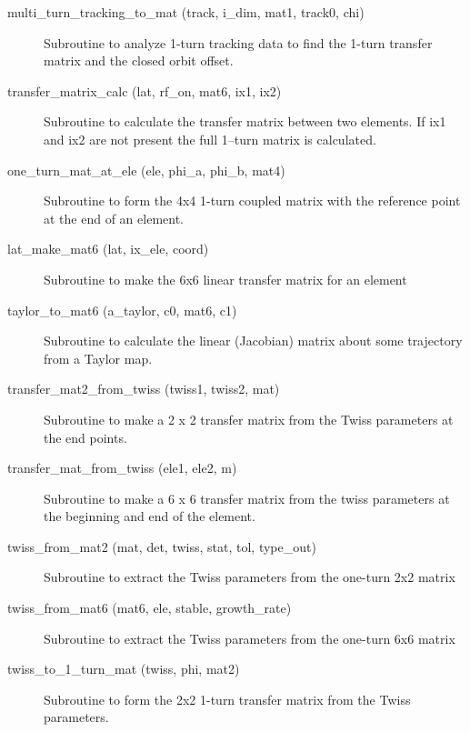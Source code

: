 \begin{description}
\label{r:multi.turn.tracking.to.mat}
\item[multi_turn_tracking_to_mat (track, i_dim, mat1, track0, chi)] \Newline
Subroutine to analyze 1-turn tracking data to find the 1-turn transfer matrix 
and the closed orbit offset.

\label{r:transfer.matrix.calc}
\item[transfer_matrix_calc (lat, rf_on, mat6, ix1, ix2)] \Newline
Subroutine to calculate the transfer matrix between two elements. If
ix1 and ix2 are not present the full 1--turn matrix is calculated.

\label{r:one.turn.mat.at.ele}
\item[one_turn_mat_at_ele (ele, phi_a, phi_b, mat4)] \Newline
Subroutine to form the 4x4 1-turn coupled matrix with the reference point 
at the end of an element. 

\label{r:lat.make.mat6}
\item[lat_make_mat6 (lat, ix_ele, coord)] \Newline
Subroutine to make the 6x6 linear transfer matrix for an element 

\label{r:taylor.to.mat6}
\item[taylor_to_mat6 (a_taylor, c0, mat6, c1)] \Newline
Subroutine to calculate the linear (Jacobian) matrix about some trajectory from a Taylor map. 

\label{r:transfer.mat2.from.twiss}
\item[transfer_mat2_from_twiss (twiss1, twiss2, mat)] \Newline
Subroutine to make a 2 x 2 transfer matrix from the Twiss parameters at the end points. 

\label{r:transfer.mat.from.twiss}
\item[transfer_mat_from_twiss (ele1, ele2, m)] \Newline 
Subroutine to make a 6 x 6 transfer matrix from the twiss parameters
at the beginning and end of the element.

\label{r:twiss.from.mat2}
\item[twiss_from_mat2 (mat, det, twiss, stat, tol, type_out)] \Newline
Subroutine to extract the Twiss parameters from the one-turn 2x2 matrix 

\label{r:twiss.from.mat6}
\item[twiss_from_mat6 (mat6, ele, stable, growth_rate)] \Newline
Subroutine to extract the Twiss parameters from the one-turn 6x6 matrix 

\label{r:twiss.to.1.turn.mat}
\item[twiss_to_1_turn_mat (twiss, phi, mat2)] \Newline
Subroutine to form the 2x2 1-turn transfer matrix from the Twiss parameters. 

\end{description}


